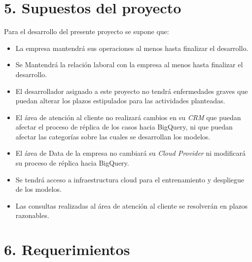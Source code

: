 \documentclass[
11pt, %
]{charter}
\begin{document}


\section{5. Supuestos del proyecto}
\label{sec:supuestos}

Para el desarrollo del presente proyecto se supone que:

\begin{itemize}
	\item La empresa mantendrá sus operaciones al menos hasta finalizar el desarrollo.
	\item Se Mantendrá la relación laboral con la empresa al menos hasta finalizar el desarrollo.
	\item El desarrollador asignado a este proyecto no tendrá enfermedades graves que puedan alterar los plazos estipulados para las actividades planteadas.
	\item El área de atención al cliente no realizará cambios en su \textit{CRM} que puedan afectar el proceso de réplica de los casos hacia BigQuery, ni que puedan afectar las categorías sobre las cuales se desarrollan los modelos.
	\item El área de Data de la empresa no cambiará su \textit{Cloud Provider} ni modificará su proceso de réplica hacia BigQuery.
	\item Se tendrá acceso a infraestructura cloud para el entrenamiento y despliegue de los modelos.
	\item Las consultas realizadas al área de atención al cliente se resolverán en plazos razonables.
	
\end{itemize}


\section{6. Requerimientos}
\label{sec:requerimientos}
\end{document}
